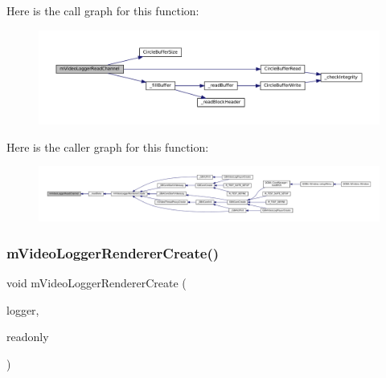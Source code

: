 Here is the call graph for this function\+:
\nopagebreak
\begin{figure}[H]
\begin{center}
\leavevmode
\includegraphics[width=350pt]{video-logger_8c_aad574cf14798e8c2e42090aa1378c7fe_cgraph}
\end{center}
\end{figure}
Here is the caller graph for this function\+:
\nopagebreak
\begin{figure}[H]
\begin{center}
\leavevmode
\includegraphics[width=350pt]{video-logger_8c_aad574cf14798e8c2e42090aa1378c7fe_icgraph}
\end{center}
\end{figure}
\mbox{\label{video-logger_8c_ad61ee4a99ebbf8066988b0da02c69838}} 
\subsubsection{\texorpdfstring{m\+Video\+Logger\+Renderer\+Create()}{mVideoLoggerRendererCreate()}}
{\footnotesize\ttfamily void m\+Video\+Logger\+Renderer\+Create (\begin{DoxyParamCaption}\item[{struct m\+Video\+Logger $\ast$}]{logger,  }\item[{\mbox{\hyperlink{libretro_8h_a4a26dcae73fb7e1528214a068aca317e}{bool}}}]{readonly }\end{DoxyParamCaption})}

